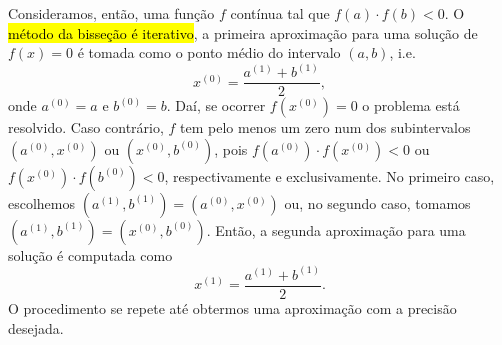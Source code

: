 Consideramos, então, uma função $f$ contínua tal que $f(a)\cdot f(b) < 0$. O \hl{método da bisseção é iterativo}, a primeira aproximação para uma solução de $f(x)=0$ é tomada como o ponto médio do intervalo $(a, b)$, i.e.
\begin{equation}
  x^{(0)} = \frac{a^{(1)}+b^{(1)}}{2},
\end{equation}
onde $a^{(0)} = a$ e $b^{(0)} = b$. Daí, se ocorrer $f(x^{(0)})=0$ o problema está resolvido. Caso contrário, $f$ tem pelo menos um zero num dos subintervalos $(a^{(0)}, x^{(0)})$ ou $(x^{(0)}, b^{(0)})$, pois $f(a^{(0)})\cdot f(x^{(0)}) < 0$ ou  $f(x^{(0)})\cdot f(b^{(0)}) < 0$, respectivamente e exclusivamente. No primeiro caso, escolhemos $(a^{(1)}, b^{(1)}) = (a^{(0)}, x^{(0)})$ ou, no segundo caso, tomamos $(a^{(1)}, b^{(1)}) = (x^{(0)}, b^{(0)})$. Então, a segunda aproximação para uma solução é computada como
\begin{equation}
  x^{(1)} = \frac{a^{(1)} + b^{(1)}}{2}.
\end{equation}
O procedimento se repete até obtermos uma aproximação com a precisão desejada.

